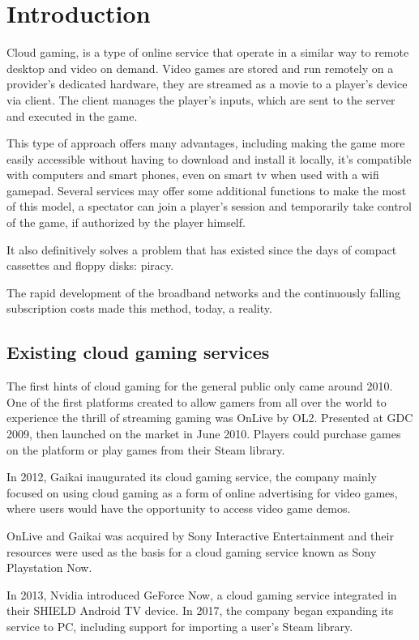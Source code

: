 \chapter{Introduction}
\label{cap:introduction}
Cloud gaming, is a type of online service that operate in a similar way to remote desktop and video on demand. Video games are stored and run remotely on a provider's dedicated hardware, they are streamed as a movie to a player's device via client. The client manages the player's inputs, which are sent to the server and executed in the game.

This type of approach offers many advantages, including making the game more easily accessible without having to download and install it locally, it's compatible with computers and smart phones, even on smart tv when used with a wifi gamepad. Several services may offer some additional functions to make the most of this model, a spectator can join a player's session and temporarily take control of the game, if authorized by the player himself.

It also definitively solves a problem that has existed since the days of compact cassettes and floppy disks: piracy.

The rapid development of the broadband networks and the continuously falling subscription costs made this method, today, a reality.

\section{Existing cloud gaming services}
The first hints of cloud gaming for the general public only came around 2010. One of the first platforms created to allow gamers from all over the world to experience the thrill of streaming gaming was OnLive by OL2. Presented at GDC 2009, then launched on the market in June 2010. Players could purchase games on the platform or play games from their Steam library.

In 2012, Gaikai inaugurated its cloud gaming service, the company mainly focused on using cloud gaming as a form of online advertising for video games, where users would have the opportunity to access video game demos.

OnLive and Gaikai was acquired by Sony Interactive Entertainment and their resources were used as the basis for a cloud gaming service known as Sony Playstation Now.

In 2013, Nvidia introduced GeForce Now, a cloud gaming service integrated in their SHIELD Android TV device. In 2017, the company began expanding its service to PC, including support for importing a user's Steam library.

